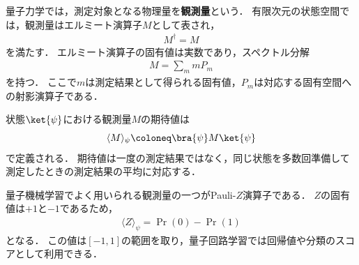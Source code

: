 量子力学では，測定対象となる物理量を\textbf{観測量}という．
有限次元の状態空間では，観測量はエルミート演算子$M$として表され，
\begin{align*}
  M^{\dagger}=M
\end{align*}
を満たす．
エルミート演算子の固有値は実数であり，スペクトル分解
\begin{align*}
  M
  =
  \sum_m mP_m
\end{align*}
を持つ．
ここで$m$は測定結果として得られる固有値，$P_m$は対応する固有空間への射影演算子である．

状態$\ket{\psi}$における観測量$M$の期待値は
\begin{equation}
  \langle M\rangle_{\psi}
  \coloneq
  \bra{\psi}M\ket{\psi}
  \label{eq:observable-expectation}
\end{equation}
で定義される．
期待値は一度の測定結果ではなく，同じ状態を多数回準備して測定したときの測定結果の平均に対応する．

量子機械学習でよく用いられる観測量の一つがPauli-$Z$演算子である．
$Z$の固有値は$+1$と$-1$であるため，
\begin{align*}
  \langle Z\rangle_{\psi}
  =
  \Pr(0)-\Pr(1)
\end{align*}
となる．
この値は$[-1,1]$の範囲を取り，量子回路学習では回帰値や分類のスコアとして利用できる．
